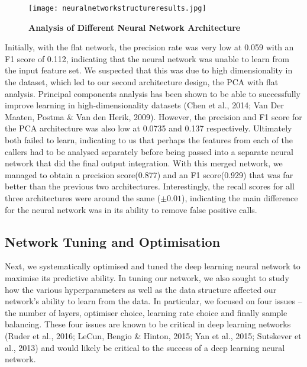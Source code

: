 \documentclass{article}
\begin{document}
\begin{figure}[H]
\texttt{[image: neuralnetworkstructureresults.jpg]}
\centering
\caption{\textbf{Analysis of Different Neural Network Architecture}}
\end{figure}
Initially, with the flat network, the precision rate was very low at 0.059 with an F1 score of 0.112, indicating that the neural network was unable to learn from the input feature set. We suspected that this was due to high dimensionality in the dataset, which led to our second architecture design, the PCA with flat analysis. Principal components analysis has been shown to be able to successfully improve learning in high-dimensionality datasets (Chen et al., 2014; Van Der Maaten, Postma \& Van den Herik, 2009). However, the precision and F1 score for the PCA architecture was also low at 0.0735 and 0.137 respectively. Ultimately both failed to learn, indicating to us that perhaps the features from each of the callers had to be analysed separately before being passed into a separate neural network that did the final output integration. With this merged network, we managed to obtain a precision score(0.877) and an F1 score(0.929) that was far better than the previous two architectures. Interestingly, the recall scores for all three architectures were around the same ($\pm 0.01$), indicating the main difference for the neural network was in its ability to remove false positive calls.

\subsection{Network Tuning and Optimisation}
Next, we systematically optimised and tuned the deep learning neural network to maximise its predictive ability. In tuning our network, we also sought to study how the various hyperparameters as well as the data structure affected our network's ability to learn from the data. In particular, we focused on four issues -- the number of layers, optimiser choice, learning rate choice and finally sample balancing. These four issues are known to be critical in deep learning networks (Ruder et al., 2016; LeCun, Bengio \& Hinton, 2015; Yan et al., 2015;  Sutskever et al., 2013) and would likely be critical to the success of a deep learning neural network.\\\\
\end{document}
